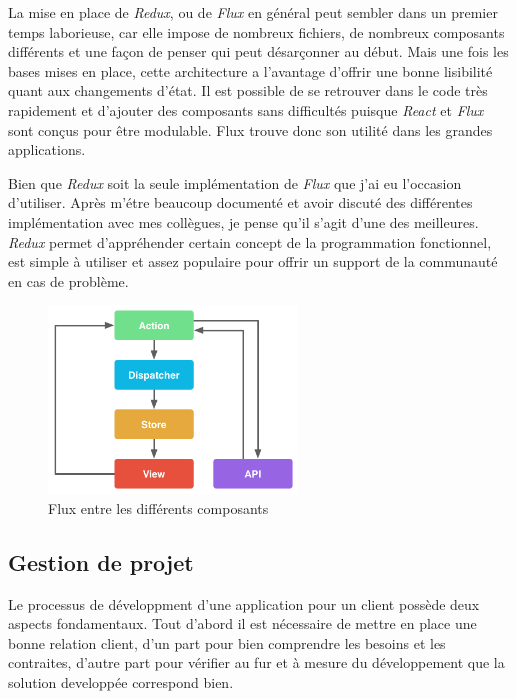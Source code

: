 \bigskip

La mise en place de \emph{Redux}, ou de \emph{Flux} en général peut
sembler dans un premier temps laborieuse, car elle impose de nombreux
fichiers, de nombreux composants différents et une façon de penser qui
peut désarçonner au début. Mais une fois les bases mises en place, cette
architecture a l'avantage d'offrir une bonne lisibilité quant aux
changements d'état. Il est possible de se retrouver dans le code très
rapidement et d'ajouter des composants sans difficultés puisque
\emph{React} et \emph{Flux} sont conçus pour être modulable. Flux trouve
donc son utilité dans les grandes applications.

\bigskip

Bien que \emph{Redux} soit la seule implémentation de \emph{Flux} que
j'ai eu l'occasion d'utiliser. Après m'étre beaucoup documenté et avoir
discuté des différentes implémentation avec mes collègues, je pense
qu'il s'agit d'une des meilleures. \emph{Redux} permet d'appréhender
certain concept de la programmation fonctionnel, est simple à utiliser
et assez populaire pour offrir un support de la communauté en cas de
problème.

\bigskip

\begin{figure}[h]
  \centering
  \includegraphics[height=5cm]{figures/react.png}
  \caption{Flux entre les différents composants}
\end{figure}

\subsection{Gestion de projet}\label{gestion-de-projet}

Le processus de développment d'une application pour un client possède
deux aspects fondamentaux. Tout d'abord il est nécessaire de mettre en
place une bonne relation client, d'un part pour bien comprendre les
besoins et les contraites, d'autre part pour vérifier au fur et à mesure
du développement que la solution developpée correspond bien.

